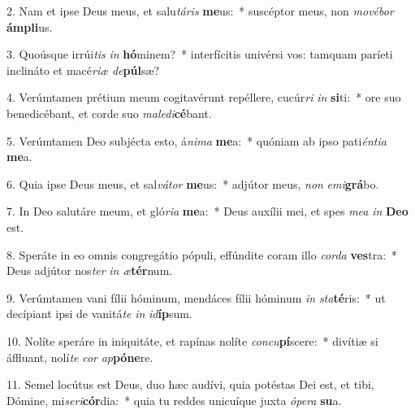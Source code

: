 2. Nam et ipse Deus meus, et salu\textit{tá}\textit{ris} \textbf{me}us:~*  suscéptor meus, non \textit{mo}\textit{vé}\textit{bor} \textbf{ám}\textbf{pli}us.\

3. Quoúsque irrúi\textit{tis} \textit{in} \textbf{hó}minem?~*  interfícitis univérsi vos: tamquam paríeti inclináto et macé\textit{ri}\textit{æ} \textit{de}\textbf{púl}sæ?\

4. Verúmtamen prétium meum cogitavérunt repéllere, cucúr\textit{ri} \textit{in} \textbf{si}ti:~*  ore suo benedicébant, et corde suo \textit{ma}\textit{le}\textit{di}\textbf{cé}bant.\

5. Verúmtamen Deo subjécta esto, á\textit{ni}\textit{ma} \textbf{me}a:~*  quóniam ab ipso pati\textit{én}\textit{ti}\textit{a} \textbf{me}a.\

6. Quia ipse Deus meus, et sal\textit{vá}\textit{tor} \textbf{me}us:~*  adjútor meus, \textit{non} \textit{e}\textit{mi}\textbf{grá}bo.\

7. In Deo salutáre meum, et gló\textit{ri}\textit{a} \textbf{me}a:~*  Deus auxílii mei, et spes \textit{me}\textit{a} \textit{in} \textbf{De}\textbf{o} est.\

8. Speráte in eo omnis congregátio pópuli, effúndite coram illo \textit{cor}\textit{da} \textbf{ves}tra:~*  Deus adjútor nos\textit{ter} \textit{in} \textit{æ}\textbf{tér}num.\

9. Verúmtamen vani fílii hóminum, mendáces fílii hóminum \textit{in} \textit{sta}\textbf{té}ris:~*  ut decípiant ipsi de vanitá\textit{te} \textit{in} \textit{id}\textbf{íp}sum.\

10. Nolíte speráre in iniquitáte, et rapínas nolíte \textit{con}\textit{cu}\textbf{pí}scere:~*  divítiæ si áffluant, nolí\textit{te} \textit{cor} \textit{ap}\textbf{pó}\textbf{ne}re.\

11. Semel locútus est Deus, duo hæc audívi, quia potéstas Dei est, et tibi, Dómine, mi\textit{se}\textit{ri}\textbf{cór}dia:~*  quia tu reddes unicuíque juxta \textit{ó}\textit{pe}\textit{ra} \textbf{su}a.\

